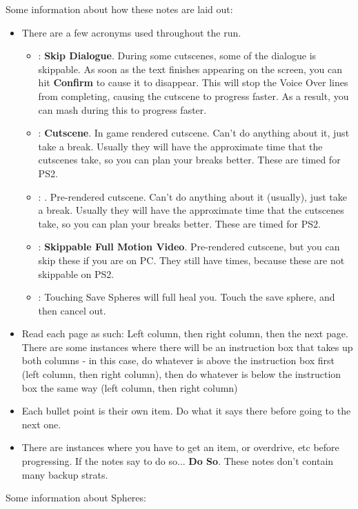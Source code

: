 Some information about how these notes are laid out:

\begin{itemize}
    \item There are a few acronyms used throughout the run.
    \begin{itemize}
        \item \sd: \textbf{Skip Dialogue}. During some cutscenes, some of the dialogue is skippable. As soon as the text finishes appearing on the screen, you can hit \textbf{Confirm} to cause it to disappear. This will stop the Voice Over lines from completing, causing the cutscene to progress faster. As a result, you can mash during this to progress faster.
        \item \cs: \textbf{Cutscene}. In game rendered cutscene. Can't do anything about it, just take a break. Usually they will have the approximate time that the cutscenes take, so you can plan your breaks better. These are timed for PS2.
        \item \fmv: . Pre-rendered cutscene. Can't do anything about it (usually), just take a break. Usually they will have the approximate time that the cutscenes take, so you can plan your breaks better. These are timed for PS2.
        \item \skippablefmv: \textbf{Skippable Full Motion Video}. Pre-rendered cutscene, but you can skip these if you are on PC. They still have times, because these are not skippable on PS2.
        \item \save: Touching Save Spheres will full heal you. Touch the save sphere, and then cancel out.
    \end{itemize}
    \item Read each page as such: Left column, then right column, then the next page. There are some instances where there will be an instruction box that takes up both columns - in this case, do whatever is above the instruction box first (left column, then right column), then do whatever is below the instruction box the same way (left column, then right column)
    \item Each bullet point is their own item. Do what it says there before going to the next one.
    \item There are instances where you have to get an item, or overdrive, etc before progressing. If the notes say to do so... \textbf{Do So}. These notes don't contain many backup strats.
\end{itemize}

Some information about Spheres:

